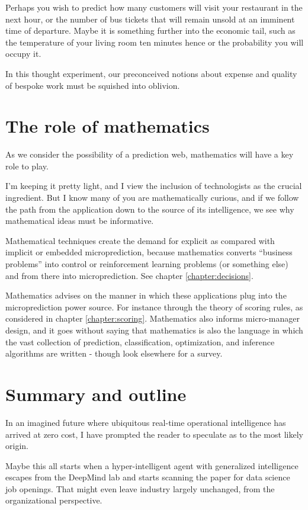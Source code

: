 Perhaps you wish to predict how many customers will visit your restaurant in the next hour, or the number of bus tickets that will remain unsold at an imminent time of departure. Maybe it is something further into the economic tail, such as the temperature of your living room ten minutes hence or the probability you will occupy it. 


In this thought experiment, our preconceived notions about expense and quality of bespoke work must be squished into oblivion. 


\section{The role of mathematics}

As we consider the possibility of a prediction web, mathematics will have a key role to play. 

I'm keeping it pretty light, and I view the inclusion of technologists as the crucial ingredient. But I know many of you are mathematically curious, and if we follow the path from the application down to the source of its intelligence, we see why mathematical ideas must be informative. 

Mathematical techniques create the demand for explicit as compared with implicit or embedded microprediction, because mathematics converts ``business problems'' into control or reinforcement learning problems (or something else) and from there into microprediction. See chapter \ref{chapter:decisions}. 

Mathematics advises on the manner in which these applications plug into the microprediction power source. For instance through the theory of scoring rules, as considered in chapter \ref{chapter:scoring}. Mathematics also informs micro-manager design, and it goes without saying that mathematics is also the language in which the vast collection of prediction, classification, optimization, and inference algorithms are written - though look elsewhere for a survey. 


\section{Summary and outline}
\label{section:case}
 
In an imagined future where ubiquitous real-time operational intelligence has arrived at zero cost, I have prompted the reader to speculate as to the most likely origin. 

Maybe this all starts when a hyper-intelligent agent with generalized intelligence escapes from the DeepMind lab and starts scanning the paper for data science job openings. That might even leave industry largely unchanged, from the organizational perspective. 


